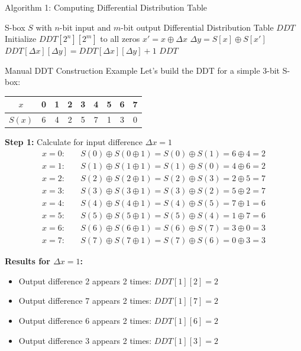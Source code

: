 \documentclass[12pt,a4paper]{article}
\theoremstyle{definition}
\newcommand{\diff}{\Delta}
\begin{document}
\begin{algorithmbox}{Algorithm 1: Computing Differential Distribution Table}
\begin{algorithmic}[1]
\REQUIRE S-box $S$ with $n$-bit input and $m$-bit output
\ENSURE Differential Distribution Table $DDT$
\STATE Initialize $DDT[2^n][2^m]$ to all zeros
\FOR{$\diff x = 0$ to $2^n - 1$}
        \STATE $x' = x \oplus \diff x$
        \STATE $\diff y = S[x] \oplus S[x']$
        \STATE $DDT[\diff x][\diff y] = DDT[\diff x][\diff y] + 1$
    \ENDFOR
\ENDFOR
\RETURN $DDT$
\end{algorithmic}
\end{algorithmbox}

\begin{examplebox}{Manual DDT Construction Example}
Let's build the DDT for a simple 3-bit S-box:
\begin{center}
\begin{tabular}{c|cccccccc}
$x$ & 0 & 1 & 2 & 3 & 4 & 5 & 6 & 7 \\
\hline
$S(x)$ & 6 & 4 & 2 & 5 & 7 & 1 & 3 & 0 \\
\end{tabular}
\end{center}

\textbf{Step 1:} Calculate for input difference $\diff x = 1$
\begin{align}
x = 0: \quad & S(0) \oplus S(0 \oplus 1) = S(0) \oplus S(1) = 6 \oplus 4 = 2 \\
x = 1: \quad & S(1) \oplus S(1 \oplus 1) = S(1) \oplus S(0) = 4 \oplus 6 = 2 \\
x = 2: \quad & S(2) \oplus S(2 \oplus 1) = S(2) \oplus S(3) = 2 \oplus 5 = 7 \\
x = 3: \quad & S(3) \oplus S(3 \oplus 1) = S(3) \oplus S(2) = 5 \oplus 2 = 7 \\
x = 4: \quad & S(4) \oplus S(4 \oplus 1) = S(4) \oplus S(5) = 7 \oplus 1 = 6 \\
x = 5: \quad & S(5) \oplus S(5 \oplus 1) = S(5) \oplus S(4) = 1 \oplus 7 = 6 \\
x = 6: \quad & S(6) \oplus S(6 \oplus 1) = S(6) \oplus S(7) = 3 \oplus 0 = 3 \\
x = 7: \quad & S(7) \oplus S(7 \oplus 1) = S(7) \oplus S(6) = 0 \oplus 3 = 3
\end{align}

\textbf{Results for $\diff x = 1$:}
\begin{itemize}
    \item Output difference 2 appears 2 times: $DDT[1][2] = 2$
    \item Output difference 7 appears 2 times: $DDT[1][7] = 2$
    \item Output difference 6 appears 2 times: $DDT[1][6] = 2$
    \item Output difference 3 appears 2 times: $DDT[1][3] = 2$
\end{itemize}
\end{examplebox}
\end{document}
